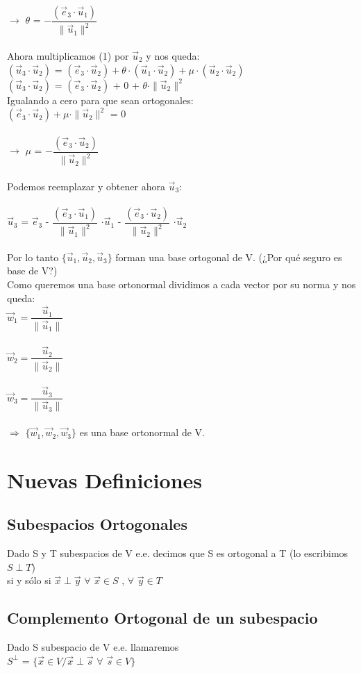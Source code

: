 \documentclass{article}
\begin{document}
$\rightarrow$ $\theta$ = $- \dfrac{(\vec{e}_3\cdot\vec{u}_1)}{\parallel\vec{u}_1\parallel^2}$\\\\
Ahora multiplicamos (1) por $\vec{u}_2$ y nos queda:\\
$(\vec{u}_3\cdot\vec{u}_2)$ = $(\vec{e}_3\cdot\vec{u}_2) + \theta\cdot(\vec{u}_1\cdot\vec{u}_2) + \mu \cdot (\vec{u}_2\cdot\vec{u}_2)$ \\
$(\vec{u}_3\cdot\vec{u}_2)$ = $(\vec{e}_3\cdot\vec{u}_2)$ + 0 + $\theta\cdot\parallel\vec{u}_2\parallel^2$\\
Igualando a cero para que sean ortogonales: \\
$(\vec{e}_3\cdot\vec{u}_2) + \mu\cdot\parallel\vec{u}_2\parallel^2$ = 0\\\\
$\rightarrow$ $\mu$ = $- \dfrac{(\vec{e}_3\cdot\vec{u}_2)}{\parallel\vec{u}_2\parallel^2}$\\\\
Podemos reemplazar y obtener ahora $\vec{u}_3$: \\\\
$\vec{u}_3$ = $\vec{e}_3$ - $\dfrac{(\vec{e}_3\cdot\vec{u}_1)}{\parallel\vec{u}_1\parallel^2}$ $\cdot\vec{u}_1$ - $\dfrac{(\vec{e}_3\cdot\vec{u}_2)}{\parallel\vec{u}_2\parallel^2}$ $\cdot\vec{u}_2$  \\\\
Por lo tanto $\{\vec{u}_1,\vec{u}_2,\vec{u}_3\}$ forman una base ortogonal de V. (¿Por qué seguro es base de V?)\\
Como queremos una base ortonormal dividimos a cada vector por su norma y nos queda: \\
$\vec{w}_1 = \dfrac{\vec{u}_1}{\parallel\vec{u}_1\parallel}$ \\\\
$\vec{w}_2 = \dfrac{\vec{u}_2}{\parallel\vec{u}_2\parallel}$ \\\\
$\vec{w}_3 = \dfrac{\vec{u}_3}{\parallel\vec{u}_3\parallel}$ \\\\
$\Rightarrow$ $\{\vec{w}_1,\vec{w}_2,\vec{w}_3\}$ es una base ortonormal de V.
\newpage
\section{Nuevas Definiciones}
\subsection{Subespacios Ortogonales}
Dado S y T subespacios de V e.e. decimos que S es ortogonal a T (lo escribimos $S \perp T$)\\ si y sólo si $\vec{x} \perp \vec{y}$  $\forall$ $\vec{x} \in S$ , $\forall$ $\vec{y} \in T$
\subsection{Complemento Ortogonal de un subespacio}
Dado S subespacio de V e.e. llamaremos\\
$S^{\perp}$ = $\{\vec{x} \in V / \vec{x} \perp \vec{s}$ $\forall$ $\vec{s} \in V\}$ 
\end{document}
